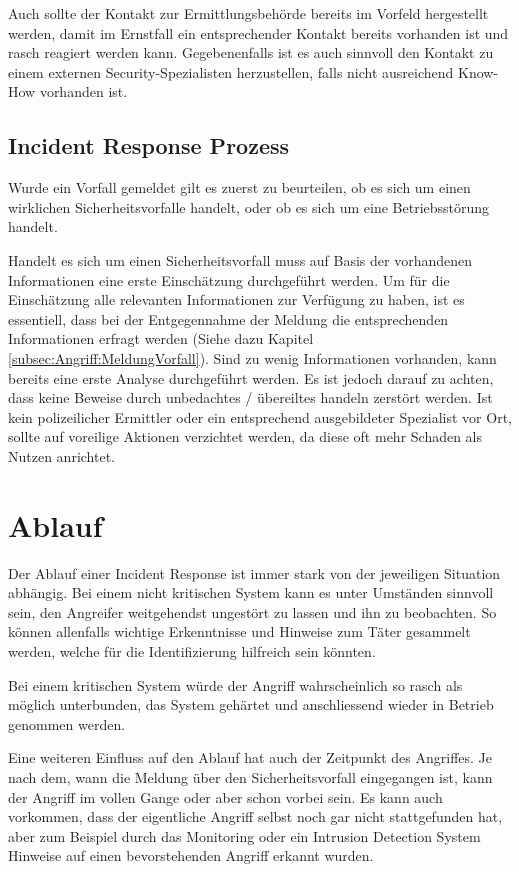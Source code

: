 Auch sollte der Kontakt zur Ermittlungsbehörde bereits im Vorfeld hergestellt werden, damit im Ernstfall ein entsprechender Kontakt bereits vorhanden ist und rasch reagiert werden kann. Gegebenenfalls ist es auch sinnvoll den Kontakt zu einem externen Security-Spezialisten herzustellen, falls nicht ausreichend Know-How vorhanden ist.

\subsection{Incident Response Prozess}
Wurde ein Vorfall gemeldet gilt es zuerst zu beurteilen, ob es sich um einen wirklichen Sicherheitsvorfalle handelt, oder ob es sich um eine Betriebsstörung handelt.

Handelt es sich um einen Sicherheitsvorfall muss auf Basis der vorhandenen Informationen eine erste Einschätzung durchgeführt werden. Um für die Einschätzung alle relevanten Informationen zur Verfügung zu haben, ist es essentiell, dass bei der Entgegennahme der Meldung die entsprechenden Informationen erfragt werden (Siehe dazu Kapitel \ref{subsec:Angriff:MeldungVorfall}). Sind zu wenig Informationen vorhanden, kann bereits eine erste Analyse durchgeführt werden. Es ist jedoch darauf zu achten, dass keine Beweise durch unbedachtes / übereiltes handeln zerstört werden. Ist kein polizeilicher Ermittler oder ein entsprechend ausgebildeter Spezialist vor Ort, sollte auf voreilige Aktionen verzichtet werden, da diese oft mehr Schaden als Nutzen anrichtet.


\section{Ablauf}
Der Ablauf einer Incident Response ist immer stark von der jeweiligen Situation abhängig. Bei einem nicht kritischen System kann es unter Umständen sinnvoll sein, den Angreifer weitgehendst ungestört zu lassen und ihn zu beobachten. So können allenfalls wichtige Erkenntnisse und Hinweise zum Täter gesammelt werden, welche für die Identifizierung hilfreich sein könnten.

Bei einem kritischen System würde der Angriff wahrscheinlich so rasch als möglich unterbunden, das System gehärtet und anschliessend wieder in Betrieb genommen werden.

Eine weiteren Einfluss auf den Ablauf hat auch der Zeitpunkt des Angriffes. Je nach dem, wann die Meldung über den Sicherheitsvorfall eingegangen ist, kann der Angriff im vollen Gange oder aber schon vorbei sein. Es kann auch vorkommen, dass der eigentliche Angriff selbst noch gar nicht stattgefunden hat, aber zum Beispiel durch das Monitoring oder ein Intrusion Detection System Hinweise auf einen bevorstehenden Angriff erkannt wurden. 

